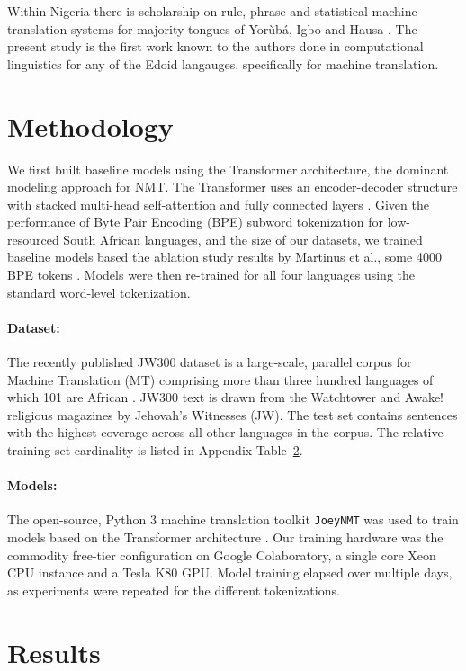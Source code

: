 \documentclass{article} %
\begin{document}
Within Nigeria there is scholarship on rule, phrase and statistical machine translation systems for majority tongues of Yor{\`u}b{\'a}, Igbo and Hausa \citep{odojelanguage}. The present study is the first work known to the authors done in computational linguistics for any of the Edoid langauges, specifically for machine translation.


\section{Methodology}
\label{methods}

We first built baseline models using the Transformer architecture, the dominant modeling approach for NMT. The Transformer uses an encoder-decoder structure with stacked multi-head self-attention and fully connected layers \citep{NIPS2017_7181}. Given the performance of Byte Pair Encoding (BPE) subword tokenization for low-resourced South African languages, and the size of our datasets, we trained baseline models based the ablation study results by Martinus et al., some 4000 BPE tokens \citep{focus_southafrica}. Models were then re-trained for all four languages using the standard word-level tokenization.

\paragraph{Dataset:} The recently published JW300 dataset is a large-scale, parallel corpus for Machine Translation (MT) comprising more than three hundred languages of which 101 are African \citep{agic-vulic-2019-jw300}. JW300 text is drawn from the Watchtower and Awake! religious magazines by Jehovah's Witnesses (JW). The test set contains sentences with the highest coverage across all other languages in the corpus. The relative training set cardinality is listed in Appendix Table~\ref{results}. 

\paragraph{Models:} The open-source, Python 3 machine translation toolkit \texttt{JoeyNMT} was used to train models based on the Transformer architecture \citep{JoeyNMT}. Our training hardware was the commodity free-tier configuration on Google Colaboratory, a single core Xeon CPU instance and a Tesla K80 GPU. Model training elapsed over multiple days, as experiments were repeated for the different tokenizations.

\section{Results}
\label{results}
\end{document}
